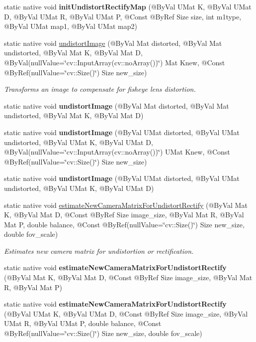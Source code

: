 \begin{DoxyCompactItemize}
static native void {\bfseries init\+Undistort\+Rectify\+Map} (@By\+Val U\+Mat K, @By\+Val U\+Mat D, @By\+Val U\+Mat R, @By\+Val U\+Mat P, @Const @By\+Ref Size size, int m1type, @By\+Val U\+Mat map1, @By\+Val U\+Mat map2)
\item 
static native void \hyperlink{group__calib3d__fisheye_gaf721f1f961fe6feedb9ff6a1fc1b169d}{undistort\+Image} (@By\+Val Mat distorted, @By\+Val Mat undistorted, @By\+Val Mat K, @By\+Val Mat D, @By\+Val(null\+Value=\char`\"{}cv\+::\+Input\+Array(cv\+::no\+Array())\char`\"{}) Mat Knew, @Const @By\+Ref(null\+Value=\char`\"{}cv\+::\+Size()\char`\"{}) Size new\+\_\+size)
\begin{DoxyCompactList}\small\item\em Transforms an image to compensate for fisheye lens distortion. \end{DoxyCompactList}\item 
static native void {\bfseries undistort\+Image} (@By\+Val Mat distorted, @By\+Val Mat undistorted, @By\+Val Mat K, @By\+Val Mat D)
\item 
static native void {\bfseries undistort\+Image} (@By\+Val U\+Mat distorted, @By\+Val U\+Mat undistorted, @By\+Val U\+Mat K, @By\+Val U\+Mat D, @By\+Val(null\+Value=\char`\"{}cv\+::\+Input\+Array(cv\+::no\+Array())\char`\"{}) U\+Mat Knew, @Const @By\+Ref(null\+Value=\char`\"{}cv\+::\+Size()\char`\"{}) Size new\+\_\+size)
\item 
static native void {\bfseries undistort\+Image} (@By\+Val U\+Mat distorted, @By\+Val U\+Mat undistorted, @By\+Val U\+Mat K, @By\+Val U\+Mat D)
\item 
static native void \hyperlink{group__calib3d__fisheye_ga0ec51dc3cf450ad76b96b9b719237f2b}{estimate\+New\+Camera\+Matrix\+For\+Undistort\+Rectify} (@By\+Val Mat K, @By\+Val Mat D, @Const @By\+Ref Size image\+\_\+size, @By\+Val Mat R, @By\+Val Mat P, double balance, @Const @By\+Ref(null\+Value=\char`\"{}cv\+::\+Size()\char`\"{}) Size new\+\_\+size, double fov\+\_\+scale)
\begin{DoxyCompactList}\small\item\em Estimates new camera matrix for undistortion or rectification. \end{DoxyCompactList}\item 
static native void {\bfseries estimate\+New\+Camera\+Matrix\+For\+Undistort\+Rectify} (@By\+Val Mat K, @By\+Val Mat D, @Const @By\+Ref Size image\+\_\+size, @By\+Val Mat R, @By\+Val Mat P)
\item 
static native void {\bfseries estimate\+New\+Camera\+Matrix\+For\+Undistort\+Rectify} (@By\+Val U\+Mat K, @By\+Val U\+Mat D, @Const @By\+Ref Size image\+\_\+size, @By\+Val U\+Mat R, @By\+Val U\+Mat P, double balance, @Const @By\+Ref(null\+Value=\char`\"{}cv\+::\+Size()\char`\"{}) Size new\+\_\+size, double fov\+\_\+scale)

\end{DoxyCompactItemize}
